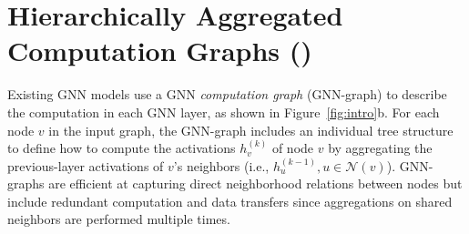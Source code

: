\section{Hierarchically Aggregated Computation Graphs (\xgs)}
\label{subsec:graph}

Existing GNN models use a GNN {\em computation graph} (GNN-graph) to describe the computation in each GNN layer, as shown in Figure~\ref{fig:intro}b.
For each node $v$ in the input graph, the GNN-graph includes an individual tree structure to define how to compute the activations $h_v^{(k)}$ of node $v$ by aggregating the previous-layer activations of $v$'s neighbors (i.e., $h^{(k-1)}_u, u \in \mathcal{N}(v)$).
GNN-graphs are efficient at capturing direct neighborhood relations between nodes but include redundant computation and data transfers since aggregations on shared neighbors are performed multiple times.



